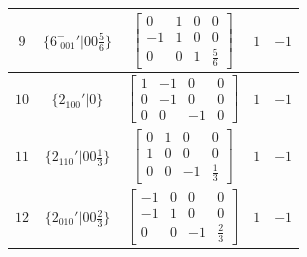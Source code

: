 \documentclass[fleqn,8pt]{jsarticle}
\begin{document}
\begin{longtable}{ccccc}
$ 9 $ & $ \{6^{-}_{\,\,001}{}'|0 0 \frac{5}{6}\} $ & $ \begin{bmatrix} 0 & 1 & 0 & 0 \\ -1 & 1 & 0 & 0 \\ 0 & 0 & 1 & \frac{5}{6} \end{bmatrix} $ & $ 1 $ & $ -1 $ \\ \hline
$ 10 $ & $ \{2{}_{100}{}'|0\} $ & $ \begin{bmatrix} 1 & -1 & 0 & 0 \\ 0 & -1 & 0 & 0 \\ 0 & 0 & -1 & 0 \end{bmatrix} $ & $ 1 $ & $ -1 $ \\ \hline
$ 11 $ & $ \{2{}_{110}{}'|0 0 \frac{1}{3}\} $ & $ \begin{bmatrix} 0 & 1 & 0 & 0 \\ 1 & 0 & 0 & 0 \\ 0 & 0 & -1 & \frac{1}{3} \end{bmatrix} $ & $ 1 $ & $ -1 $ \\ \hline
$ 12 $ & $ \{2{}_{010}{}'|0 0 \frac{2}{3}\} $ & $ \begin{bmatrix} -1 & 0 & 0 & 0 \\ -1 & 1 & 0 & 0 \\ 0 & 0 & -1 & \frac{2}{3} \end{bmatrix} $ & $ 1 $ & $ -1 $ \\
\end{longtable}
\end{document}
